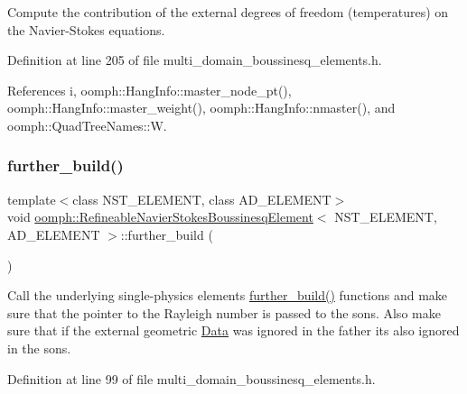 Compute the contribution of the external degrees of freedom (temperatures) on the Navier-\/\+Stokes equations. 



Definition at line 205 of file multi\+\_\+domain\+\_\+boussinesq\+\_\+elements.\+h.



References i, oomph\+::\+Hang\+Info\+::master\+\_\+node\+\_\+pt(), oomph\+::\+Hang\+Info\+::master\+\_\+weight(), oomph\+::\+Hang\+Info\+::nmaster(), and oomph\+::\+Quad\+Tree\+Names\+::W.

\mbox{\label{classoomph_1_1RefineableNavierStokesBoussinesqElement_a8b7b18f473b0fa9c4127de305e5a6ccc}} 
\subsubsection{\texorpdfstring{further\+\_\+build()}{further\_build()}}
{\footnotesize\ttfamily template$<$class N\+S\+T\+\_\+\+E\+L\+E\+M\+E\+NT, class A\+D\+\_\+\+E\+L\+E\+M\+E\+NT$>$ \\
void \hyperlink{classoomph_1_1RefineableNavierStokesBoussinesqElement}{oomph\+::\+Refineable\+Navier\+Stokes\+Boussinesq\+Element}$<$ N\+S\+T\+\_\+\+E\+L\+E\+M\+E\+NT, A\+D\+\_\+\+E\+L\+E\+M\+E\+NT $>$\+::further\+\_\+build (\begin{DoxyParamCaption}{ }\end{DoxyParamCaption})\hspace{0.3cm}{\ttfamily [inline]}}



Call the underlying single-\/physics element\textquotesingle{}s \hyperlink{classoomph_1_1RefineableNavierStokesBoussinesqElement_a8b7b18f473b0fa9c4127de305e5a6ccc}{further\+\_\+build()} functions and make sure that the pointer to the Rayleigh number is passed to the sons. Also make sure that if the external geometric \hyperlink{classoomph_1_1Data}{Data} was ignored in the father it\textquotesingle{}s also ignored in the sons. 



Definition at line 99 of file multi\+\_\+domain\+\_\+boussinesq\+\_\+elements.\+h.



